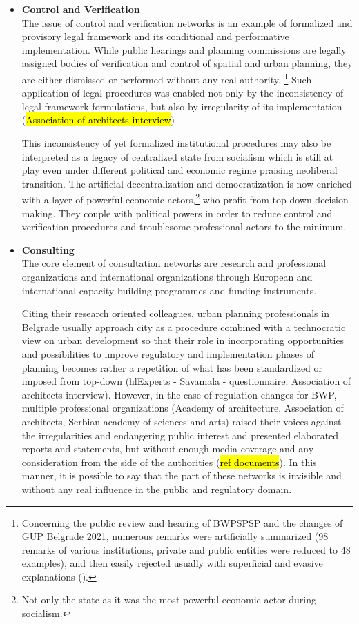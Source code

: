 \documentclass[11pt]{report}
\begin{document}
\begin{itemize}
\item \textbf{Control and Verification}
\\
The issue of control and verification networks is an example of formalized and provisory legal framework and its conditional and performative implementation. While public hearings and planning commissions are legally assigned bodies of verification and control of spatial and urban planning, they are either dismissed or performed without any real authority.
\footnote{Concerning the public review and hearing of BWPSPSP and the changes of GUP Belgrade 2021, numerous remarks were artificially summarized (98 remarks of various institutions, private and public entities were reduced to 48 examples), and then easily rejected usually with superficial and evasive explanations (\cite{Alternativni izvestaj}).}
Such application of legal procedures was enabled  not only by the inconsistency of legal framework formulations, but also by irregularity of its implementation (\hl{Association of architects interview})

This inconsistency of yet formalized institutional procedures may also be interpreted as a legacy of centralized state from socialism which is still at play even under different political and economic regime praising neoliberal transition.
The artificial decentralization and democratization is now enriched with a layer of powerful economic actors,\footnote{Not only the state as it was  the most powerful economic actor during socialism.}
who profit from top-down decision making.
They couple with political powers in order to reduce control and verification procedures and troublesome professional actors to the minimum.
\\

\item \textbf{Consulting}
\\
The core element of consultation networks are research and professional organizations and international organizations through European and international capacity building programmes and funding instruments.

Citing their research oriented colleagues, urban planning professionals in Belgrade usually approach city as a procedure combined with a technocratic view on urban development so that their role in incorporating opportunities and possibilities to improve regulatory and implementation phases of planning becomes rather a repetition of what has been standardized or imposed from top-down (hl{Experts - Savamala - questionnaire; Association of architects interview}).
However, in the case of regulation changes for BWP, multiple professional organizations (Academy of architecture, Association of architects, Serbian academy of sciences and arts) raised their voices against the irregularities and endangering public interest and presented elaborated reports and statements, but without enough media coverage and any consideration from the side of the authorities (\hl{ref documents}).
In this manner, it is possible to say that the part of these networks is invisible and without any real influence in the public and regulatory domain.


\end{itemize}
\end{document}
